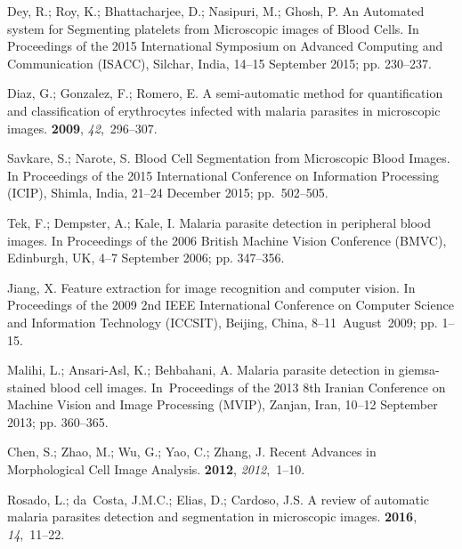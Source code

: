 \documentclass[sensors,review,accept,moreauthors,pdftex,10pt,a4paper]{mdpi}
\begin{document}
\begin{thebibliography}{999}
Dey, R.; Roy, K.; Bhattacharjee, D.; Nasipuri, M.; Ghosh, P.
\newblock An Automated system for Segmenting platelets from Microscopic images
  of Blood Cells.
\newblock  In Proceedings of the 2015 International Symposium on Advanced
  Computing and Communication (ISACC), Silchar, India, 14--15 September 2015; pp. 230--237.

Diaz, G.; Gonzalez, F.; Romero, E.
\newblock A semi-automatic method for quantification and classification of
  erythrocytes infected with malaria parasites in microscopic images.
 {\bf 2009}, {\em
  42},~296--307.

Savkare, S.; Narote, S.
\newblock Blood Cell Segmentation from Microscopic Blood Images.
\newblock  In Proceedings of the 2015 International Conference on Information
  Processing (ICIP), Shimla, India, 21--24 December 2015; pp.~502--505.

Tek, F.; Dempster, A.; Kale, I.
\newblock Malaria parasite detection in peripheral blood images.
\newblock  In Proceedings of the 2006 British Machine Vision Conference (BMVC), Edinburgh, UK, 4--7 September  2006;  pp. 347--356.

Jiang, X.
\newblock Feature extraction for image recognition and computer vision.
\newblock  In Proceedings of the 2009 2nd IEEE International Conference on
  Computer Science and Information Technology (ICCSIT), Beijing, China, \mbox{8--11 August 2009}; pp. 1--15.

Malihi, L.; Ansari-Asl, K.; Behbahani, A.
\newblock Malaria parasite detection in giemsa-stained blood cell images.
\newblock  In~Proceedings of the 2013 8th Iranian Conference on Machine Vision
  and Image Processing (MVIP), Zanjan, Iran, 10--12 September 2013; pp. 360--365.
 
Chen, S.; Zhao, M.; Wu, G.; Yao, C.; Zhang, J.
\newblock Recent Advances in Morphological Cell Image Analysis.
 {\bf 2012},
  {\em 2012},~1--10.

Rosado, L.; da~Costa, J.M.C.; Elias, D.; Cardoso, J.S.
\newblock A review of automatic malaria parasites detection and segmentation in
  microscopic images.
 {\bf 2016}, {\em 14},~11--22.

\end{thebibliography}



\end{document}
